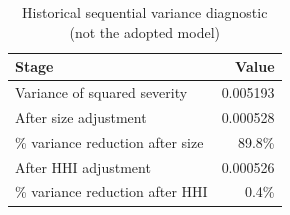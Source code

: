 \begin{table}[htbp]
\centering
\caption{Historical sequential variance diagnostic (not the adopted model)}
\label{tab:variance_attribution}
\begin{tabular}{lr}
\toprule
\textbf{Stage} & \textbf{Value} \\
\midrule
Variance of squared severity & 0.005193 \\
After size adjustment & 0.000528 \\
\% variance reduction after size & 89.8\% \\
After HHI adjustment & 0.000526 \\
\% variance reduction after HHI & 0.4\% \\
\bottomrule
\end{tabular}
\end{table}
